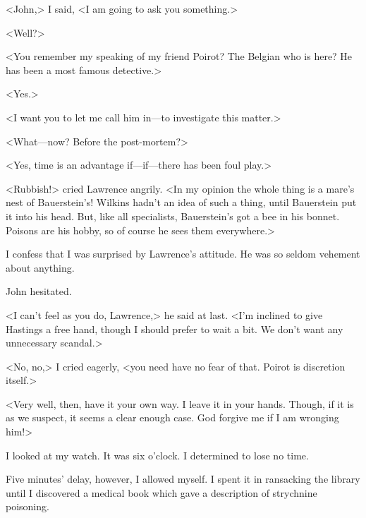  <John,> I said, <I am going to ask you something.> 

 <Well?> 

 <You remember my speaking of my friend Poirot? The Belgian who is here? He has been a most famous detective.> 

 <Yes.> 

 <I want you to let me call him in—to investigate this matter.> 

 <What—now? Before the post-mortem?> 

 <Yes, time is an advantage if—if—there has been foul play.> 

 <Rubbish!> cried Lawrence angrily. <In my opinion the whole thing is a mare's nest of Bauerstein's! Wilkins hadn't an idea of such a thing, until Bauerstein put it into his head. But, like all specialists, Bauerstein's got a bee in his bonnet. Poisons are his hobby, so of course he sees them everywhere.> 

 I confess that I was surprised by Lawrence's attitude. He was so seldom vehement about anything. 

 John hesitated. 

 <I can't feel as you do, Lawrence,> he said at last. <I'm inclined to give Hastings a free hand, though I should prefer to wait a bit. We don't want any unnecessary scandal.> 

 <No, no,> I cried eagerly, <you need have no fear of that. Poirot is discretion itself.> 

 <Very well, then, have it your own way. I leave it in your hands. Though, if it is as we suspect, it seems a clear enough case. God forgive me if I am wronging him!> 

 I looked at my watch. It was six o'clock. I determined to lose no time. 

 Five minutes' delay, however, I allowed myself. I spent it in ransacking the library until I discovered a medical book which gave a description of strychnine poisoning.